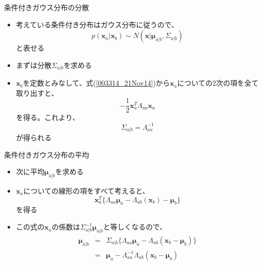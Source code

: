 \begin{frame}{条件付きガウス分布の分散}
 \begin{itemize}
  \item 考えている条件付き分布はガウス分布に従うので、
        \begin{equation}
         p(\bm{x}_a | \bm{x}_b) \sim N(\bm{x} | \bm{\mu}_{a|b}, \Sigma_{a|b})
        \end{equation}
        と表せる
  \item まずは分散$\Sigma_{a|b}$を求める
  \item $\bm{x}_b$を定数とみなして、式(\ref{003314_21Nov14})から$\bm{x}_a$についての2次の項を全て取り出すと、
        \begin{equation}
         -\frac{1}{2}\bm{x}_a^T\Lambda_{aa}\bm{x}_a
        \end{equation}
        を得る。これより、
        \begin{equation}
         \Sigma_{a|b} = \Lambda_{aa}^{-1}
        \end{equation}
        が得られる
 \end{itemize}
\end{frame}

\begin{frame}{条件付きガウス分布の平均}
 \begin{itemize}
  \item 次に平均$\bm{\mu}_{a|b}$を求める
  \item $\bm{x}_a$についての線形の項をすべて考えると、
        \begin{equation}
         \bm{x}_a^T\{ \Lambda_{aa}\bm{\mu}_a-\Lambda_{ab}(\bm{x}_b)-\bm{\mu}_b\}
        \end{equation}
        を得る
  \item この式の$\bm{x}_a$の係数は$\Sigma^{-1}_{a|b}\bm{\mu}_{a|b}$と等しくなるので、
        \begin{eqnarray}
         \bm{\mu}_{a|b} &=& \Sigma_{a|b}\{\Lambda_{aa}\bm{\mu}_a-\Lambda_{ab}(\bm{x}_b-\bm{\mu}_b)\}\\
         &= & \bm{\mu}_a - \Lambda_{aa}^{-1}\Lambda_{ab}(\bm{x}_b-\bm{\mu}_b)
        \end{eqnarray}
 \end{itemize}
\end{frame}

